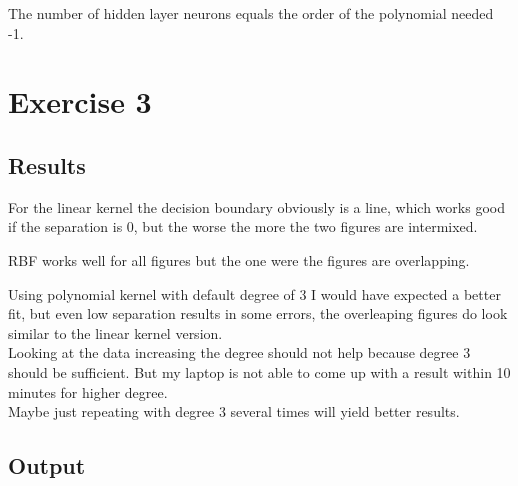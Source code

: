 \documentclass[paper=a4, fontsize=11pt]{scrartcl} %
\numberwithin{equation}{section} %
\numberwithin{figure}{section} %
\numberwithin{table}{section} %
\begin{document}
The number of hidden layer neurons equals the order of the polynomial needed -1.

\section{Exercise 3}
\subsection{Results}
For the linear kernel the decision boundary obviously is a line, which works good if the separation is 0, but the worse the more the two figures are intermixed.\vspace{5mm}

RBF works well for all figures but the one were the figures are overlapping.\vspace{5mm}

Using polynomial kernel with default degree of 3 I would have expected a better fit, but even low separation results in some errors, the overleaping figures do look similar to the linear kernel version.\\ Looking at the data increasing the degree should not help because degree 3 should be sufficient. But my laptop is not able to come up with a result within 10 minutes for higher degree.\\
Maybe just repeating with degree 3 several times will yield better results.
\subsection{Output}
\end{document}
